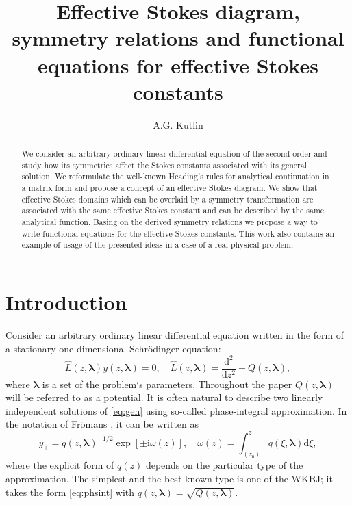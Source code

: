 \documentclass[atmp]{ipart_v1}
\def\rmd{\mathrm{d}}
\def\rmi{\mathrm{i}}
\def\LL{\widehat{L}}
\def\lmbd{\bm{\lambda}}
\def\w{\omega}
\newcommand\eref[1]{\eqref{#1}}
\newcommand\phsintgrnd[1][z]{q(#1,\lmbd)}
\newcommand\predexp[1][z]{q(#1,\lmbd)^{-1/2}}
\newcommand\phsintgrl[3][z]{\int_{#2}^{#3} \phsintgrnd[#1] \rmd #1}
\begin{document}
\title[Symmetry relations for effective Stokes constants]{Effective Stokes diagram, symmetry relations and functional equations for effective Stokes constants}
\author[A.G. Kutlin]{A.G. Kutlin}




\begin{abstract}
We consider an arbitrary ordinary linear differential equation of the second order and study 
how its symmetries affect the Stokes constants associated with its general solution. 
We reformulate the well-known Heading's rules for analytical continuation in a matrix form 
and propose a concept of an effective Stokes diagram. We show that effective Stokes 
domains which can be overlaid by a symmetry transformation are associated with the same 
effective Stokes constant and can be described by the same analytical function. Basing on
the derived symmetry relations we propose a way to write functional equations for 
the effective Stokes constants. This work also contains an example of usage 
of the presented ideas in a case of a real physical problem.
\end{abstract}



\maketitle

\section{Introduction \label{sec:intro}}
Consider an arbitrary ordinary linear differential equation written in the form of 
a stationary one-dimensional Schr\"odinger equation:
\begin{equation}
\LL(z,\lmbd)y(z,\lmbd)=0, \quad \LL(z,\lmbd)=\frac{\rmd^2}{\rmd z^2} + Q(z,\lmbd),   \label{eq:gen}
\end{equation}
where $\lmbd$ is a set of the problem`s parameters. Throughout the paper 
$Q(z,\lmbd)$ will be referred to as a potential. It is often natural to describe two 
linearly independent solutions of \eref{eq:gen} using so-called phase-integral 
approximation. In the notation of Fr\"omans \cite{frbook}, it can be written as
\begin{equation}
y_\pm = \predexp \exp [\pm \rmi \w(z)], \quad \w(z)=\phsintgrl[\xi]{(z_0)}{z},   \label{eq:phsint}
\end{equation}
where the explicit form of $q(z)$ depends on the particular type of the approximation.
The simplest and the best-known type is one of the WKBJ\cite{wkb1,wkb2,wkb3,wkbj}; 
it takes the form \eref{eq:phsint} with $\phsintgrnd = \sqrt{Q(z,\lmbd)}$.
\end{document}
